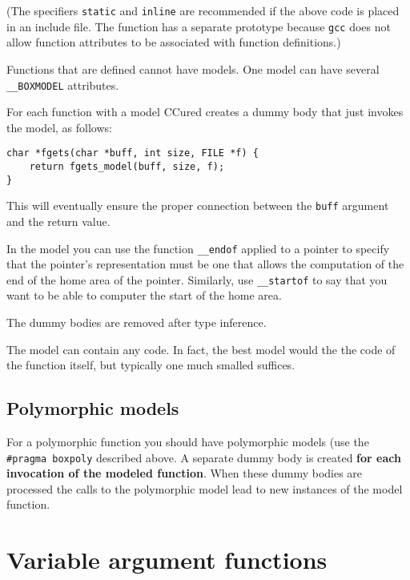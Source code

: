 \documentclass{book}
\def\t#1{{\tt #1}}
\begin{document}
 (The specifiers \t{static} and \t{inline} are recommended if the above code
 is placed in an include file. The function has a separate prototype because
 \t{gcc} does not allow function attributes to be associated with function
 definitions.)

 Functions that are defined cannot have models. One model can have several
 \t{\_\_BOXMODEL} attributes. 

 For each function with a model CCured creates a dummy body that just invokes
 the model, as follows: 

\begin{verbatim}
char *fgets(char *buff, int size, FILE *f) {
    return fgets_model(buff, size, f);
}
\end{verbatim}

 This will eventually ensure the proper connection between the \t{buff}
argument and the return value. 

 In the model you can use the function \t{\_\_endof} applied to a pointer to
specify that the pointer's representation must be one that allows the
computation of the end of the home area of the pointer. Similarly, use
\t{\_\_startof} to say that you want to be able to computer the start of the
home area. 

 The dummy bodies are removed after type inference. 

 The model can contain any code. In fact, the best model would the the code of
 the function itself, but typically one much smalled suffices.

     \subsection{Polymorphic models}

 For a polymorphic function you should have polymorphic models (use the
\t{\#pragma boxpoly} described above. A separate dummy body is created {\bf for
each invocation of the modeled function}. When these dummy bodies are
processed the calls to the polymorphic model lead to new instances of the
model function. 
 

    \section{Variable argument functions}
\end{document}
